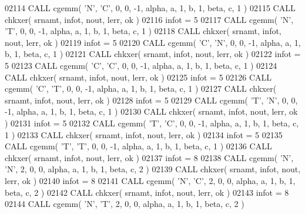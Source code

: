\begin{DoxyCode}
02114       \textcolor{keyword}{CALL }cgemm( \textcolor{stringliteral}{'N'}, \textcolor{stringliteral}{'C'}, 0, 0, -1, alpha, a, 1, b, 1, beta, c, 1 )
02115       \textcolor{keyword}{CALL }chkxer( srnamt, infot, nout, lerr, ok )
02116       infot = 5
02117       \textcolor{keyword}{CALL }cgemm( \textcolor{stringliteral}{'N'}, \textcolor{stringliteral}{'T'}, 0, 0, -1, alpha, a, 1, b, 1, beta, c, 1 )
02118       \textcolor{keyword}{CALL }chkxer( srnamt, infot, nout, lerr, ok )
02119       infot = 5
02120       \textcolor{keyword}{CALL }cgemm( \textcolor{stringliteral}{'C'}, \textcolor{stringliteral}{'N'}, 0, 0, -1, alpha, a, 1, b, 1, beta, c, 1 )
02121       \textcolor{keyword}{CALL }chkxer( srnamt, infot, nout, lerr, ok )
02122       infot = 5
02123       \textcolor{keyword}{CALL }cgemm( \textcolor{stringliteral}{'C'}, \textcolor{stringliteral}{'C'}, 0, 0, -1, alpha, a, 1, b, 1, beta, c, 1 )
02124       \textcolor{keyword}{CALL }chkxer( srnamt, infot, nout, lerr, ok )
02125       infot = 5
02126       \textcolor{keyword}{CALL }cgemm( \textcolor{stringliteral}{'C'}, \textcolor{stringliteral}{'T'}, 0, 0, -1, alpha, a, 1, b, 1, beta, c, 1 )
02127       \textcolor{keyword}{CALL }chkxer( srnamt, infot, nout, lerr, ok )
02128       infot = 5
02129       \textcolor{keyword}{CALL }cgemm( \textcolor{stringliteral}{'T'}, \textcolor{stringliteral}{'N'}, 0, 0, -1, alpha, a, 1, b, 1, beta, c, 1 )
02130       \textcolor{keyword}{CALL }chkxer( srnamt, infot, nout, lerr, ok )
02131       infot = 5
02132       \textcolor{keyword}{CALL }cgemm( \textcolor{stringliteral}{'T'}, \textcolor{stringliteral}{'C'}, 0, 0, -1, alpha, a, 1, b, 1, beta, c, 1 )
02133       \textcolor{keyword}{CALL }chkxer( srnamt, infot, nout, lerr, ok )
02134       infot = 5
02135       \textcolor{keyword}{CALL }cgemm( \textcolor{stringliteral}{'T'}, \textcolor{stringliteral}{'T'}, 0, 0, -1, alpha, a, 1, b, 1, beta, c, 1 )
02136       \textcolor{keyword}{CALL }chkxer( srnamt, infot, nout, lerr, ok )
02137       infot = 8
02138       \textcolor{keyword}{CALL }cgemm( \textcolor{stringliteral}{'N'}, \textcolor{stringliteral}{'N'}, 2, 0, 0, alpha, a, 1, b, 1, beta, c, 2 )
02139       \textcolor{keyword}{CALL }chkxer( srnamt, infot, nout, lerr, ok )
02140       infot = 8
02141       \textcolor{keyword}{CALL }cgemm( \textcolor{stringliteral}{'N'}, \textcolor{stringliteral}{'C'}, 2, 0, 0, alpha, a, 1, b, 1, beta, c, 2 )
02142       \textcolor{keyword}{CALL }chkxer( srnamt, infot, nout, lerr, ok )
02143       infot = 8
02144       \textcolor{keyword}{CALL }cgemm( \textcolor{stringliteral}{'N'}, \textcolor{stringliteral}{'T'}, 2, 0, 0, alpha, a, 1, b, 1, beta, c, 2 )

\end{DoxyCode}
